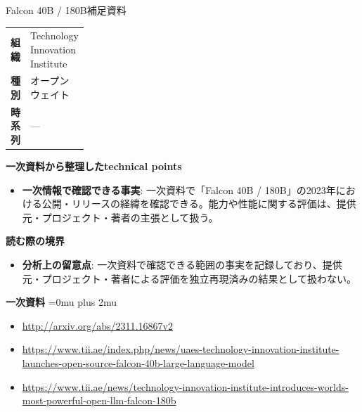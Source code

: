 \begin{technicalnote}{Falcon 40B / 180B}{補足資料}
\begingroup
\begin{tabularx}{\linewidth}{@{}>{\bfseries}p{0.22\linewidth}X@{}}
組織 & Technology Innovation Institute \\
種別 & オープンウェイト \\
時系列 & — \\
\end{tabularx}
\smallskip
{\bfseries 一次資料から整理したtechnical points}
\begin{itemize}[leftmargin=1.5em,itemsep=0.35em]
\item \textbf{一次情報で確認できる事実}: 一次資料で「Falcon 40B / 180B」の2023年における公開・リリースの経緯を確認できる。能力や性能に関する評価は、提供元・プロジェクト・著者の主張として扱う。
\end{itemize}
\begin{minipage}{\linewidth}
{\bfseries 読む際の境界}
\begin{itemize}[leftmargin=1.5em,itemsep=0.35em]
\item \textbf{分析上の留意点}: 一次資料で確認できる範囲の事実を記録しており、提供元・プロジェクト・著者による評価を独立再現済みの結果として扱わない。
\end{itemize}
\begin{samepage}
{\bfseries 一次資料}
\begingroup\sloppy
\Urlmuskip=0mu plus 2mu\relax
\begin{itemize}[leftmargin=1.5em,itemsep=0.25em]
\item {\scriptsize\url{http://arxiv.org/abs/2311.16867v2}}
\item {\scriptsize\url{https://www.tii.ae/index.php/news/uaes-technology-innovation-institute-launches-open-source-falcon-40b-large-language-model}}
\item {\scriptsize\url{https://www.tii.ae/news/technology-innovation-institute-introduces-worlds-most-powerful-open-llm-falcon-180b}}
\end{itemize}
\endgroup
\end{samepage}
\end{minipage}
\endgroup
\end{technicalnote}
\medskip

